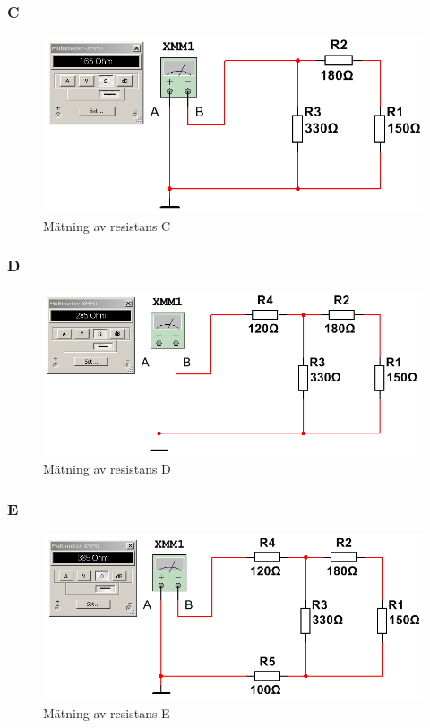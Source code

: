 \documentclass[11pt,a4paper]{article}
\begin{document}
\subsubsection{C}
\begin{figure}[H]
    \centering
    \includegraphics[scale=0.5]{ee466multisim/4c.png}
    \caption{Mätning av resistans C}
    \label{fig:sim-4c}
\end{figure}

\subsubsection{D}
\begin{figure}[H]
    \centering
    \includegraphics[scale=0.5]{ee466multisim/4d.png}
    \caption{Mätning av resistans D}
    \label{fig:sim-4d}
\end{figure}

\subsubsection{E}
\begin{figure}[H]
    \centering
    \includegraphics[scale=0.5]{ee466multisim/4e.png}
    \caption{Mätning av resistans E}
    \label{fig:sim-4e}
\end{figure}
\end{document}
